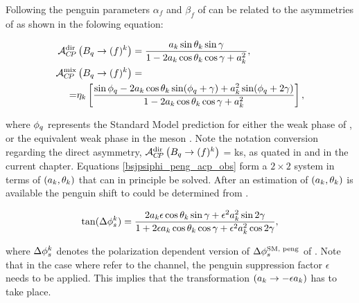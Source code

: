 Following \cite{Faller:2008gt} the penguin parameters $\alpha_f$ and $\beta_f$ of 
can be related to the \CP asymmetries of  as shown in the folowing equation:

\begin{subequations}
  \label{bsjpsiphi_peng_acp_obs}
  \begin{align}
    \mathcal{A}_{C\!P}^{\rm dir}&\left( B_q\rightarrow (f)^k \right) = \frac{ a_k \sin\theta_k \sin\gamma} {1 - 2 a_k \cos\theta_k \cos\gamma + a_k^{2}}, \label{bsjpsiphi_peng_acp_dir} \\
    \mathcal{A}_{C\!P}^{\rm mix}&\left( B_q\rightarrow (f)^k \right) = \nonumber \\
    = & \eta_k \left[ \frac{\sin\phi_q - 2a_k \cos\theta_k\sin(\phi_q+\gamma) + a_k^2 \sin(\phi_q+2\gamma)}
                                                                 {1 - 2 a_k \cos\theta_k \cos\gamma + a_k^{2}}  \right], \label{bsjpsiphi_peng_acp_mix}
  \end{align}
\end{subequations}

\noindent where $\phi_q$ represents the Standard Model prediction for either the weak phase \phis of ,
or the equivalent weak phase \phid in the \Bd meson \cite{PDG}. Note the notation conversion regarding the direct \CP 
asymmetry, $\mathcal{A}_{C\!P}^{\rm dir}\left(B_q\rightarrow (f)^k\right)$ = \Acp{k}, as quated in  
and in the current chapter. Equations \ref{bsjpsiphi_peng_acp_obs} form a $2\times2$ system in
terms of $(a_k,\theta_k)$ that can in principle be solved. After an estimation of $(a_k,\theta_k)$ is available the
penguin shift to \phis could be determined from .

\begin{equation}
\centering
\tan(\Delta\phis^k) = \frac{ 2\akPeng\epsilon\cos\thkPeng \sin\gamma + \epsilon^2\akPeng^2 \sin2\gamma}
                             {1 + 2\epsilon\akPeng \cos\thkPeng \cos\gamma + \epsilon^2\akPeng^2 \cos2\gamma},
\label{tandelta}
\end{equation}

\noindent where $\Delta\phi_{s}^k$ denotes the polarization dependent version of $\Delta\phi_{s}^{\tiny\text {SM, peng}}$ of .
Note that in the case where  refer to the \BsJpsiPhi channel, the penguin suppression factor
$\epsilon$ needs to be applied. This implies that the transformation $(a_k\rightarrow-\epsilon a_k)$ has to take place.

